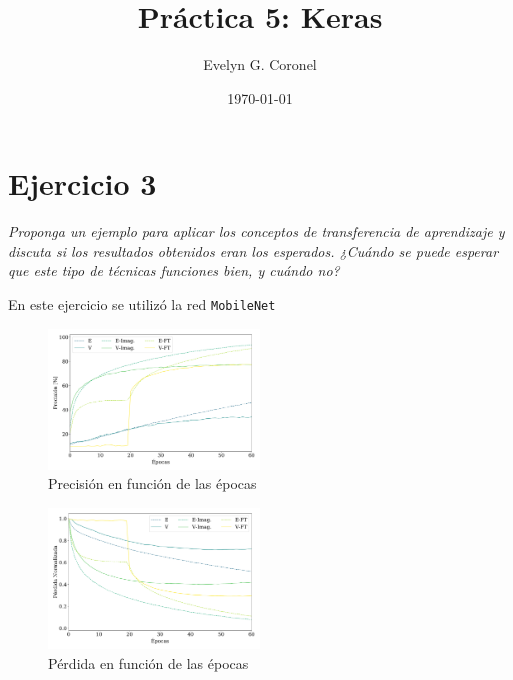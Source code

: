 
\usepackage{multirow}


\title{Práctica 5: Keras}
\author{Evelyn G. Coronel}


\date[]{\lowercase{\today}} 

\maketitle

\section*{Ejercicio 3}
\emph{Proponga un ejemplo para aplicar los conceptos de transferencia de aprendizaje y discuta si los resultados obtenidos eran los esperados.  ¿Cuándo se puede esperar que este tipo de técnicas funciones bien, y cuándo no?}


En este ejercicio se utilizó la red \verb|MobileNet|

\begin{figure}[H]
    \begin{small}
        \begin{center}
            \includegraphics[width=0.5\textwidth]{Figs/ejer3_acc.pdf}
        \end{center}
        \caption{Precisión en función de las épocas}
        \label{fig:ejer3_acc}
    \end{small}
\end{figure}



\begin{figure}[H]
    \begin{small}
        \begin{center}
            \includegraphics[width=0.5\textwidth]{Figs/ejer3_loss.pdf}
        \end{center}
        \caption{Pérdida en función de las épocas}
        \label{fig:ejer3_acc}
    \end{small}
\end{figure}



